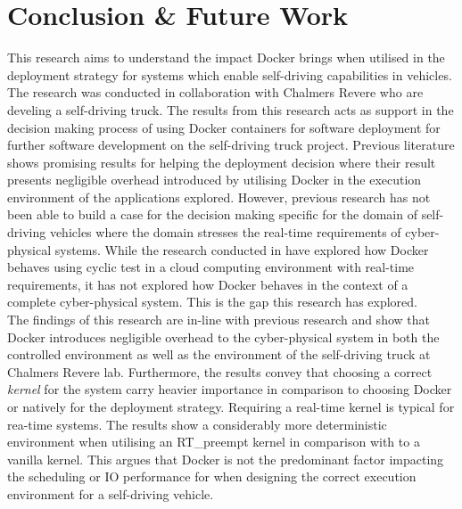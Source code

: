\iffalse  \fi
\chapter{Conclusion \& Future Work} \label{section:conclusion}

This research aims to understand the impact Docker brings when utilised in the deployment strategy for systems which enable self-driving capabilities in vehicles. The research was conducted in collaboration with Chalmers Revere who are develing a self-driving truck. The results from this research acts as support in the decision making process of using Docker containers for software deployment for further software development on the self-driving truck project. Previous literature \cite{p6,c2,p3,p4,p7,c1} shows promising results for helping the deployment decision where their result presents negligible overhead introduced by utilising Docker in the execution environment of the applications explored. However, previous research has not been able to build a case for the decision making specific for the domain of self-driving vehicles where the domain stresses the real-time requirements of cyber-physical systems. While the research conducted in \cite{p1} have explored how Docker behaves using cyclic test in a cloud computing environment with real-time requirements, it has not explored how Docker behaves in the context of a complete cyber-physical system. This is the gap this research has explored.\\

The findings of this research are in-line with previous research and show that Docker introduces negligible overhead to the cyber-physical system in both the controlled environment as well as the environment of the self-driving truck at Chalmers Revere lab. Furthermore, the results convey that choosing a correct \textit{kernel} for the system carry heavier importance in comparison to choosing Docker or natively for the deployment strategy. Requiring a real-time kernel is typical for rea-time systems. The results show a considerably more deterministic environment when utilising an RT\_preempt kernel in comparison with to a vanilla kernel. This argues that Docker is not the predominant factor impacting the scheduling or IO performance for when designing the correct execution environment for a self-driving vehicle.\\

